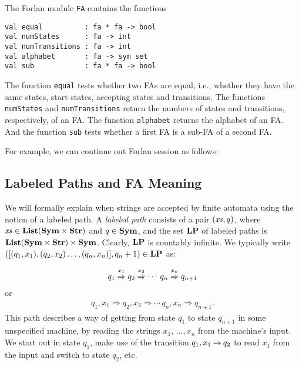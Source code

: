 The Forlan module \texttt{FA} contains the functions
\begin{verbatim}
val equal          : fa * fa -> bool
val numStates      : fa -> int
val numTransitions : fa -> int
val alphabet       : fa -> sym set
val sub            : fa * fa -> bool
\end{verbatim}
%
%
%
%
%
The function \texttt{equal} tests whether two FAs are equal, i.e.,
whether they have the same states, start states, accepting states
and transitions.
The functions \texttt{numStates} and \texttt{numTransitions} return
the numbers of states and transitions, respectively, of an FA.
The function \texttt{alphabet} returns the alphabet of an FA.  
And the function \texttt{sub} tests whether a first FA is a sub-FA of
a second FA.

For example, we can continue out Forlan session as follows:


\subsection{Labeled Paths and FA Meaning}

We will formally explain when strings are accepted by finite automata
%
%
%
using the notion of a labeled path.  A \emph{labeled path} consists of
a pair $({\it xs},q)$, where ${\it xs}\in\mathbf{List}(\mathbf{Sym}\times\mathbf{Str})$ and $q\in\mathbf{Sym}$,
and the set $\mathbf{LP}$ of labeled paths is
$\mathbf{List}(\mathbf{Sym}\times\mathbf{Str})\times\mathbf{Sym}$.  Clearly, $\mathbf{LP}$ is countably
infinite.  We typically write
$([(q_1,x_1),(q_2,x_2)\ldots,(q_n,x_n)],q_n+1)\in\mathbf{LP}$ as:
\begin{gather*}
q_1\stackrel{\strut x_1}{\Rightarrow}q_2\stackrel{\strut x_2}{\Rightarrow}\cdots\,q_n\stackrel{\strut x_n}{\Rightarrow}q_{n+1}
\end{gather*}
or
\begin{gather*}
q_1,x_1\Rightarrow q_2,x_2\Rightarrow\cdots\,q_n,x_n\Rightarrow q_{n+1} .
\end{gather*}
This path describes a way of getting from state $q_1$ to state $q_{n+1}$
in some unspecified machine, by reading the strings
$x_1,\,\ldots,x_n$ from the machine's input.  We start out in
state $q_1$, make use of the transition $q_1,x_1\mathbin{\to} q_2$ to read
$x_1$ from the input and switch to state $q_2$, etc.

